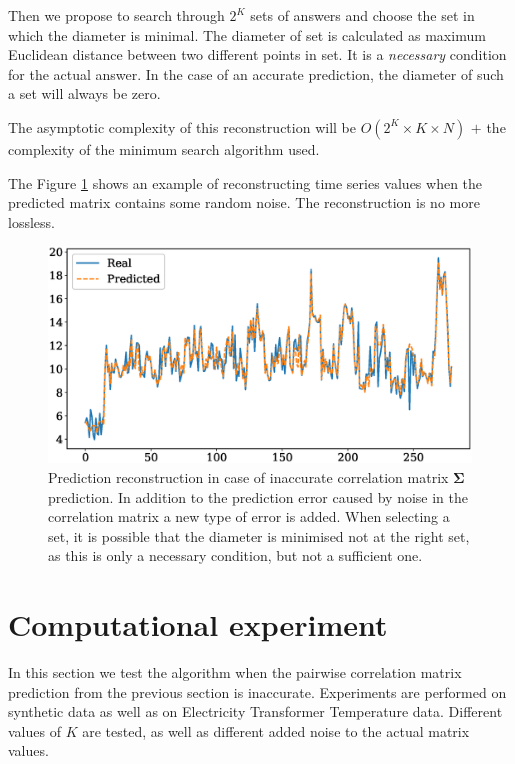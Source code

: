 \documentclass[12pt]{article}
\begin{document}
{Then we propose to search through $2^K$ sets of answers and choose the set in which the diameter is minimal. The diameter of set is calculated as maximum Euclidean distance between two different points in set. It is a \emph{necessary} condition for the actual answer. In the case of an accurate prediction, the diameter of such a set will always be zero.

The asymptotic complexity of this reconstruction will be $O(2^K \times K \times N)$ $+$ the complexity of the minimum search algorithm used.

The Figure \ref{fig:fig4} shows an example of reconstructing time series values when the predicted matrix contains some random noise. The reconstruction is no more lossless.

\begin{figure}[!htbp]
	\centering
	\includegraphics[width=\textwidth]{NonIdealRecovery.eps}
	\caption{Prediction reconstruction in case of inaccurate correlation matrix $\mathbf{\Sigma}$ prediction. In addition to the prediction error caused by noise in the correlation matrix a new type of error is added. When selecting a set, it is possible that the diameter is minimised not at the right set, as this is only a necessary condition, but not a sufficient one.}
	\label{fig:fig4}
\end{figure}

\section{Computational experiment}

In this section we test the algorithm when the pairwise correlation matrix prediction from the previous section is inaccurate. Experiments are performed on synthetic data as well as on Electricity Transformer Temperature \cite{haoyietal-informer-2021} data. Different values of $K$ are tested, as well as different added noise to the actual matrix values.

}
\end{document}
